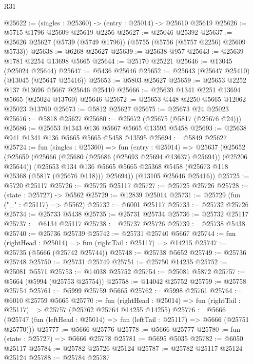 \begin{lexlean}{R31}
\begin{coremodule}
@25622 := (singles : @25360) -> (entry : @25014) -> @25610 @25619
@25626 := @5715 @1796 @25609 @25619 @2256
@25627 := @25046 @25392
@25637 := @25626 @25627 (@5739 (@5749 @1796)) (@5755 (@5756 (@5757 @2256) @25609 @5733))
@25638 := @6268 @25627
@25639 := @25638 @957
@25643 := @25639 @1781 @2254 @13698 @5665
@25644 := @25170 @25221
@25646 := @13045 (@25024 @25644)
@25647 := @5436 @25646
@25652 := @25643 (@25647 @25410) (@13045 (@25647 @25416))
@25653 := @5803 @25627
@25659 := @25653 @2252 @137 @13696 @5667 @25646 @25410
@25666 := @25639 @1341 @2251 @13694 @5665 (@25024 @13760) @25646
@25672 := @25653 @448 @2250 @5665 @12062 @25023 @13760
@25673 := @5812 @25627
@25675 := @25673 @24 @25023
@25676 := @5818 @25627
@25680 := @25672 (@25675 (@5817 (@25676 @24)))
@25686 := @25653 @1343 @136 @5667 @5665 @13595 @5458
@25693 := @25638 @941 @1341 @136 @5665 @5665 @5458 @13595
@25694 := @5849 @25627
@25724 := fun (singles : @25360) =>
  fun (entry : @25014) =>
  @25637
    (@25652
      (@25659
        (@25666 (@25680 (@25686 (@25693 @25694 @13637) @25694)) (@25206 @25644))
        (@25653
          @134
          @136
          @5665
          @5665
          @25368
          @5458
          (@25673 @118 @25368 (@5817 (@25676 @118)))
          @25694))
      (@13105 @25646 @25416))
@25725 := @5720 @25117
@25726 := @25725 @25117
@25727 := @25725 @25726
@25728 := (state : @25727) -> @5562
@25729 := @12839 @25014
@25731 := @25729 (fun ("_" : @25117) => @5562)
@25732 := @6001 @25117
@25733 := @25732 @25726
@25734 := @25733 @5438
@25735 := @25731 @25734
@25736 := @25732 @25117
@25737 := @6134 @25117
@25738 := @25737 @25726
@25739 := @25738 @5438
@25740 := @25736 @25739
@25742 := @25731 @25740 @5667
@25744 := fun (rightHead : @25014) => fun (rightTail : @25117) => @14215
@25747 := @25735 (@5666 (@25742 @25744))
@25748 := @25738 @5652
@25749 := @25736 @25748
@25750 := @25731 @25749
@25751 := @25750 @14235
@25752 := @25081 @5571
@25753 := @14038 @25752
@25754 := @25081 @5872
@25757 := @5664 (@5994 (@25753 @25754))
@25758 := @14042 @25752
@25759 := @25758 @25754
@25761 := @5999 @25759 @5665
@25762 := @5998 @25761
@25764 := @6010 @25759 @5665
@25770 := fun (rightHead : @25014) =>
  fun (rightTail : @25117) => @25757 (@25762 @25764 @14255 @14255)
@25776 := @5666
    (@25747 (fun (leftHead : @25014) => fun (leftTail : @25117) => @5666 (@25751 @25770)))
@25777 := @5666 @25776
@25778 := @5666 @25777
@25780 := fun (state : @25727) => @5666 @25778
@25781 := @5695 @5035
@25782 := @6050 @25117
@25784 := @25782 @25726 @25124
@25787 := @25782 @25117 @25124 @25124
@25788 := @25784 @25787

\end{coremodule}
\end{lexlean}
